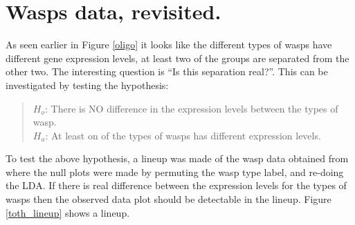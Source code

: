 \documentclass[12]{article}
\begin{document}

\section{Wasps data, revisited. }


As seen earlier in Figure \ref{oligo} it looks like the different types of wasps have different gene expression levels, at least two of the groups are separated from the other two.  The interesting question is ``Is this separation real?''. This can be investigated by testing the hypothesis: 

\begin{quote}
$H_o$: There is NO difference in the expression levels between the types of wasp.\\
$H_a$: At least on of the types of wasps has different expression levels.
\end{quote}


To test the above hypothesis, a lineup was made of the wasp data obtained from \cite{toth:2010} where the null plots were made by permuting the wasp type label, and re-doing the LDA. If there is real difference between the expression levels for the types of wasps then the observed data plot should be detectable in the lineup. Figure \ref{toth_lineup} shows a lineup. 
\end{document}

